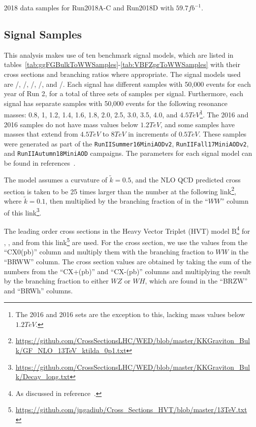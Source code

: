\begin{table}[htbp]
  \centering
  
  \caption{
    2018 data samples for Run2018A-C and Run2018D with $59.7\unit{fb^{-1}}$.
  }
  \label{tab:dataSamples2018}
\end{table}

\subsection{Signal Samples}
\label{sec:sigSamples}

This analysis makes use of ten benchmark signal models, which are listed in tables~\ref{tab:ggFGBulkToWWSamples}-\ref{tab:VBFZprToWWSamples} with their cross sections and branching ratios where appropriate.
The signal models used are \ggF/\VBF\GBulktoWWtolnuqqbarpr, \ggF/\VBF\RadtoWWtolnuqqbarpr, \DY/\VBF\WprtoWZtolnuqqbar, \DY/\VBF\WprtoWHtolnubbbar, and \DY/\VBF\ZprtoWWtolnuqqbarpr.
Each signal has different samples with 50,000 events for each year of Run 2, for a total of three sets of samples per signal.
Furthermore, each signal has separate samples with 50,000 events for the following resonance masses: 0.8, 1, 1.2, 1.4, 1.6, 1.8, 2.0, 2.5, 3.0, 3.5, 4.0, and $4.5\unit{TeV}$\footnote{The 2016 \VBF\ZprtoWW and 2016 \VBF\WprtoWZ sets are the exception to this, lacking mass values below $1.2\unit{TeV}$.}.
The 2016 \VBF\ZprtoWW and 2016 \VBF\WprtoWZ samples do not have mass values below $1.2\unit{TeV}$, and some samples have masses that extend from $4.5\unit{TeV}$ to $8\unit{TeV}$ in increments of $0.5\unit{TeV}$.
These samples were generated as part of the \texttt{RunIISummer16MiniAODv2}, \texttt{RunIIFall17MiniAODv2}, and \texttt{RunIIAutumn18MiniAOD} campaigns.
The parameters for each signal model can be found in references~\cite{git:BulkGrav_WW,git:Wpr_WZ,git:Wpr_WH,git:VBFRad_WW}.

The \ggF\GBulktoWW model assumes a curvature of $\tilde{k}=0.5$, and the NLO QCD predicted cross section is taken to be 25 times larger than the number at the following link\footnote{\url{https://github.com/CrossSectionsLHC/WED/blob/master/KKGraviton\_Bulk/GF\_NLO\_13TeV\_ktilda_0p1.txt}}, where $\tilde{k}=0.1$, then multiplied by the branching fraction of \GBulktoWW in the ``$WW$'' column of this link\footnote{\url{https://github.com/CrossSectionsLHC/WED/blob/master/KKGraviton\_Bulk/Decay\_long.txt}}. %

The leading order cross sections in the Heavy Vector Triplet (HVT) model B\footnote{As discussed in reference~\cite{Pappadopulo_2014}.} for \DY\ZprtoWW, \DY\WprtoWZ, and \DY\WprtoWH from this link\footnote{\url{https://github.com/jngadiub/Cross\_Sections\_HVT/blob/master/13TeV.txt}} are used. %
For the \Zpr cross section, we use the values from the ``CX0(pb)'' column and multiply them with the branching fraction to $WW$ in the ``BRWW'' column.
The \Wpr cross section values are obtained by taking the sum of the numbers from the ``CX+(pb)'' and ``CX-(pb)'' columns and multiplying the result by the branching fraction to either $WZ$ or $WH$, which are found in the ``BRZW'' and ``BRWh'' columns.

